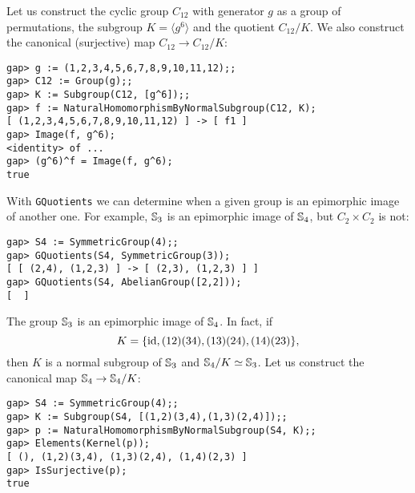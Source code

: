 \begin{example}
Let us construct the cyclic group
$C_{12}$ with generator $g$ 
as a group of permutations, 
the subgroup $K=\langle g^6\rangle$ and the quotient  $C_{12}/K$. 
We also construct the canonical (surjective) map $C_{12}\to C_{12}/K$: 
\begin{lstlisting}
gap> g := (1,2,3,4,5,6,7,8,9,10,11,12);;
gap> C12 := Group(g);;
gap> K := Subgroup(C12, [g^6]);;
gap> f := NaturalHomomorphismByNormalSubgroup(C12, K);
[ (1,2,3,4,5,6,7,8,9,10,11,12) ] -> [ f1 ]
gap> Image(f, g^6);
<identity> of ...
gap> (g^6)^f = Image(f, g^6);
true
\end{lstlisting}
\end{example}

\begin{example}
    With \lstinline{GQuotients} 
    we can determine when 
    a given group is an epimorphic image of another one. 
    For example, $\mathbb{S}_3$ is an epimorphic image of $\mathbb{S}_4$, but 
    $C_2\times C_2$ is not:
\begin{lstlisting}
gap> S4 := SymmetricGroup(4);;
gap> GQuotients(S4, SymmetricGroup(3));
[ [ (2,4), (1,2,3) ] -> [ (2,3), (1,2,3) ] ]
gap> GQuotients(S4, AbelianGroup([2,2]));
[  ]
\end{lstlisting}
\end{example}

\begin{example}
    The group $\mathbb{S}_3$ is an epimorphic image of $\mathbb{S}_4$. In fact, 
    if 
    \[
    K=\{\operatorname{id},(12)(34),(13)(24),(14)(23)\}, 
    \]
    then 
    $K$ is a normal subgroup of $\mathbb{S}_3$ and
    $\mathbb{S}_4/K\simeq\mathbb{S}_3$. Let us construct
    the canonical map $\mathbb{S}_4\to\mathbb{S}_4/K$:
\begin{lstlisting}
gap> S4 := SymmetricGroup(4);;
gap> K := Subgroup(S4, [(1,2)(3,4),(1,3)(2,4)]);;
gap> p := NaturalHomomorphismByNormalSubgroup(S4, K);;
gap> Elements(Kernel(p));
[ (), (1,2)(3,4), (1,3)(2,4), (1,4)(2,3) ]
gap> IsSurjective(p);
true
\end{lstlisting}
\end{example}


